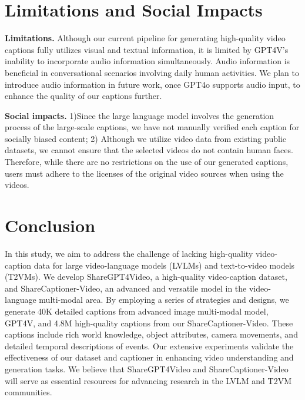 \section{Limitations and Social Impacts}
\label{sec:limitation}
\textbf{Limitations.} Although our current pipeline for generating high-quality video captions fully utilizes visual and textual information, it is limited by GPT4V's inability to incorporate audio information simultaneously. Audio information is beneficial in conversational scenarios involving daily human activities. We plan to introduce audio information in future work, once GPT4o supports audio input, to enhance the quality of our captions further.

\textbf{Social impacts.} 1)Since the large language model involves the generation process of the large-scale captions, we have not manually verified each caption for socially biased content; 2) Although we utilize video data from existing public datasets, we cannot ensure that the selected videos do not contain human faces. Therefore, while there are no restrictions on the use of our generated captions, users must adhere to the licenses of the original video sources when using the videos.

\section{Conclusion}
In this study, we aim to address the challenge of lacking high-quality video-caption data for large video-language models (LVLMs) and text-to-video models (T2VMs). We develop ShareGPT4Video, a high-quality video-caption dataset, and ShareCaptioner-Video, an advanced and versatile model in the video-language multi-modal area. By employing a series of strategies and designs, we generate 40K detailed captions from advanced image multi-modal model, GPT4V, and 4.8M high-quality captions from our ShareCaptioner-Video. These captions include rich world knowledge, object attributes, camera movements, and detailed temporal descriptions of events. Our extensive experiments validate the effectiveness of our dataset and captioner in enhancing video understanding and generation tasks. We believe that ShareGPT4Video and ShareCaptioner-Video will serve as essential resources for advancing research in the LVLM and T2VM communities.

\clearpage

